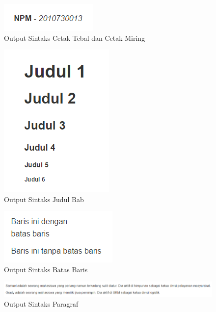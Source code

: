 \begin{figure}[H]
\centering
\includegraphics[scale=1]{Gambar/cetaktebal.png}
\caption[Output Sintaks Cetak Tebal dan Cetak Miring]{Output Sintaks Cetak Tebal dan Cetak Miring} 
\label{fig:cetaktebal}
\end{figure}

\begin{figure}[H]
\centering
\includegraphics[scale=1]{Gambar/judul.png}
\caption[Output Sintaks Judul Bab]{Output Sintaks Judul Bab} 
\label{fig:judul}
\end{figure}

\begin{figure}[H]
\centering
\includegraphics[scale=1]{Gambar/batasbaris.png}
\caption[Output Sintaks Batas Baris]{Output Sintaks Batas Baris} 
\label{fig:batasbaris}
\end{figure}

\begin{figure}[H]
\centering
\includegraphics[scale=0.5]{Gambar/paragraf.png}
\caption[Output Sintaks Paragraf]{Output Sintaks Paragraf} 
\label{fig:paragraf}
\end{figure}


